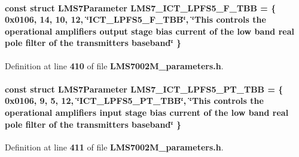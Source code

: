 \paragraph[{L\+M\+S7\+\_\+\+I\+C\+T\+\_\+\+L\+P\+F\+S5\+\_\+\+F\+\_\+\+T\+BB}]{\setlength{\rightskip}{0pt plus 5cm}const struct {\bf L\+M\+S7\+Parameter} L\+M\+S7\+\_\+\+I\+C\+T\+\_\+\+L\+P\+F\+S5\+\_\+\+F\+\_\+\+T\+BB = \{ 0x0106, 14, 10, 12, \char`\"{}\+I\+C\+T\+\_\+\+L\+P\+F\+S5\+\_\+\+F\+\_\+\+T\+B\+B\char`\"{}, \char`\"{}\+This controls the operational amplifier\textquotesingle{}s output stage bias current of the low band real pole filter of the transmitter\textquotesingle{}s baseband\char`\"{} \}\hspace{0.3cm}{\ttfamily [static]}}\label{LMS7002M__parameters_8h_a954b29715baac6e587cce628cadadf83}


Definition at line {\bf 410} of file {\bf L\+M\+S7002\+M\+\_\+parameters.\+h}.

\paragraph[{L\+M\+S7\+\_\+\+I\+C\+T\+\_\+\+L\+P\+F\+S5\+\_\+\+P\+T\+\_\+\+T\+BB}]{\setlength{\rightskip}{0pt plus 5cm}const struct {\bf L\+M\+S7\+Parameter} L\+M\+S7\+\_\+\+I\+C\+T\+\_\+\+L\+P\+F\+S5\+\_\+\+P\+T\+\_\+\+T\+BB = \{ 0x0106, 9, 5, 12, \char`\"{}\+I\+C\+T\+\_\+\+L\+P\+F\+S5\+\_\+\+P\+T\+\_\+\+T\+B\+B\char`\"{}, \char`\"{}\+This controls the operational amplifier\textquotesingle{}s input stage bias current of the low band real pole filter of the transmitter\textquotesingle{}s baseband\char`\"{} \}\hspace{0.3cm}{\ttfamily [static]}}\label{LMS7002M__parameters_8h_a55e5f8ddf97a672dca6c420c32e3d2f7}


Definition at line {\bf 411} of file {\bf L\+M\+S7002\+M\+\_\+parameters.\+h}.

